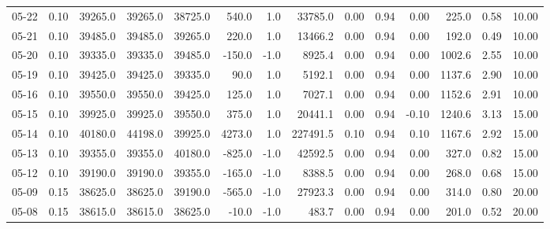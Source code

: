 \begin{threeparttable}
{\begin{tabular}{lrrrrrrrrrrrrr}
  05-22 &     0.10 & 39265.0 & 39265.0 & 38725.0 &      540.0 &                      1.0 &             33785.0 &       0.00 &      0.94 &           0.00 &            225.0 &            0.58 &                  10.00 \\
  05-21 &     0.10 & 39485.0 & 39485.0 & 39265.0 &      220.0 &                      1.0 &             13466.2 &       0.00 &      0.94 &           0.00 &            192.0 &            0.49 &                  10.00 \\
  05-20 &     0.10 & 39335.0 & 39335.0 & 39485.0 &     -150.0 &                     -1.0 &              8925.4 &       0.00 &      0.94 &           0.00 &           1002.6 &            2.55 &                  10.00 \\
  05-19 &     0.10 & 39425.0 & 39425.0 & 39335.0 &       90.0 &                      1.0 &              5192.1 &       0.00 &      0.94 &           0.00 &           1137.6 &            2.90 &                  10.00 \\
  05-16 &     0.10 & 39550.0 & 39550.0 & 39425.0 &      125.0 &                      1.0 &              7027.1 &       0.00 &      0.94 &           0.00 &           1152.6 &            2.91 &                  10.00 \\
  05-15 &     0.10 & 39925.0 & 39925.0 & 39550.0 &      375.0 &                      1.0 &             20441.1 &       0.00 &      0.94 &          -0.10 &           1240.6 &            3.13 &                  15.00 \\
  05-14 &     0.10 & 40180.0 & 44198.0 & 39925.0 &     4273.0 &                      1.0 &            227491.5 &       0.10 &      0.94 &           0.10 &           1167.6 &            2.92 &                  15.00 \\
  05-13 &     0.10 & 39355.0 & 39355.0 & 40180.0 &     -825.0 &                     -1.0 &             42592.5 &       0.00 &      0.94 &           0.00 &            327.0 &            0.82 &                  15.00 \\
  05-12 &     0.10 & 39190.0 & 39190.0 & 39355.0 &     -165.0 &                     -1.0 &              8388.5 &       0.00 &      0.94 &           0.00 &            268.0 &            0.68 &                  15.00 \\
  05-09 &     0.15 & 38625.0 & 38625.0 & 39190.0 &     -565.0 &                     -1.0 &             27923.3 &       0.00 &      0.94 &           0.00 &            314.0 &            0.80 &                  20.00 \\
  05-08 &     0.15 & 38615.0 & 38615.0 & 38625.0 &      -10.0 &                     -1.0 &               483.7 &       0.00 &      0.94 &           0.00 &            201.0 &            0.52 &                  20.00 \\

\end{tabular}}
\end{threeparttable}
